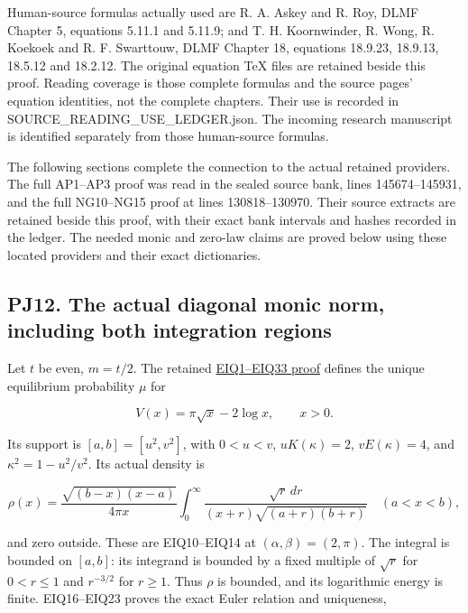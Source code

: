 \documentclass[10pt]{article}
\begin{document}
Human-source formulas actually used are R. A. Askey and R. Roy, DLMF Chapter 5, equations 5.11.1 and 5.11.9; and T. H. Koornwinder, R. Wong, R. Koekoek and R. F. Swarttouw, DLMF Chapter 18, equations 18.9.23, 18.9.13, 18.5.12 and 18.2.12. The original equation TeX files are retained beside this proof. Reading coverage is those complete formulas and the source pages' equation identities, not the complete chapters. Their use is recorded in SOURCE\_READING\_USE\_LEDGER.json. The incoming research manuscript is identified separately from those human-source formulas.

The following sections complete the connection to the actual retained providers. The full AP1--AP3 proof was read in the sealed source bank, lines 145674--145931, and the full NG10--NG15 proof at lines 130818--130970. Their source extracts are retained beside this proof, with their exact bank intervals and hashes recorded in the ledger. The needed monic and zero-law claims are proved below using these located providers and their exact dictionaries.

\subsection{PJ12. The actual diagonal monic norm, including both integration regions}\label{pj12.-the-actual-diagonal-monic-norm-including-both-integration-regions}

Let \(t\) be even, \(m=t/2\). The retained \href{https://github.com/KokunoYumeto/zeta-function-research-reader/blob/5992ad50c0f2a06921f1fcaded7b4e38097c0739/workbenches/splitzero-tandem/continuations/20260920-original-kernel-mixed-determinants/providers/09_INPUT_CUMULATIVE_PROOFS.tex\#L4381}{EIQ1--EIQ33 proof} defines the unique equilibrium probability \(\mu\) for

\[
V(x)=\pi\sqrt{x}-2\log x,\qquad x>0.
\tag{PJ52}
\]

Its support is \([a,b]=[u^2,v^2]\), with \(0<u<v\), \(uK(\kappa)=2\), \(vE(\kappa)=4\), and \(\kappa^2=1-u^2/v^2\). Its actual density is

\[
\rho(x)=\frac{\sqrt{(b-x)(x-a)}}{4\pi x}
\int_0^\infty\frac{\sqrt r\,dr}{(x+r)\sqrt{(a+r)(b+r)}}
\quad(a<x<b),
\tag{PJ53}
\]

and zero outside. These are EIQ10--EIQ14 at \((\alpha,\beta)=(2,\pi)\). The integral is bounded on \([a,b]\): its integrand is bounded by a fixed multiple of \(\sqrt r\) for \(0<r\le1\) and \(r^{-3/2}\) for \(r\ge1\). Thus \(\rho\) is bounded, and its logarithmic energy is finite. EIQ16--EIQ23 proves the exact Euler relation and uniqueness,
\end{document}
